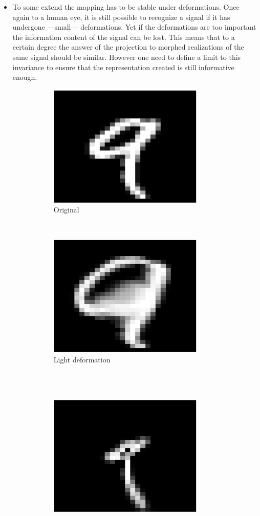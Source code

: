 \documentclass[a4paper,11pt]{report}
\begin{document}
\begin{itemize}
				\item To some extend the mapping has to be stable under deformations. Once again to a human eye, it is still possible to recognize a signal if it has undergone ---small--- deformations. Yet if the deformations are too important the information content of the signal can be lost. This means that to a certain degree the answer of the projection to morphed realizations of the same signal should be similar. However one need to define a limit to this invariance to ensure that the representation created is still informative enough.\\
				
				\begin{figure}[h]
					\centering
					\begin{subfigure}[t]{0.48\textwidth}
						\centering
						\includegraphics[height=2.3in]{im_nine_ori.eps}
						\caption{\centering Original}
					\end{subfigure}%
					~
					\begin{subfigure}[t]{0.48\textwidth}
						\centering
						\includegraphics[height=2.3in]{im_nine_def_Vsmall.eps}
						\caption{\centering Light deformation}
					\end{subfigure}%
					\\
					~
					\begin{subfigure}[t]{0.48\textwidth}
						\centering
						\includegraphics[height=2.3in]{im_nine_def_small.eps}

\end{subfigure}
\end{figure}
\end{itemize}
\end{document}
